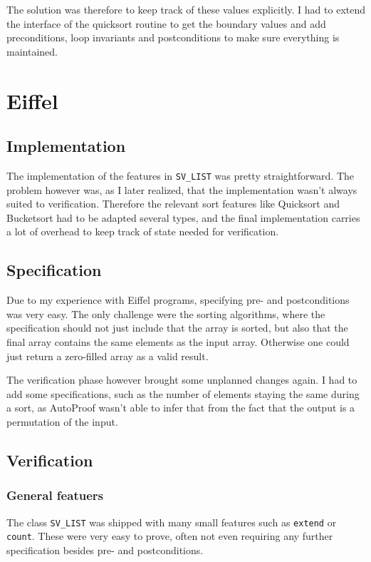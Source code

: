 \documentclass[a4paper,10pt]{article}
\begin{document}
The solution was therefore to keep track of these values explicitly.
I had to extend the interface of the quicksort routine to get the boundary values and add preconditions, 
loop invariants and postconditions to make sure everything is maintained.


\section{Eiffel}

\subsection{Implementation}

The implementation of the features in \lstinline!SV_LIST! was pretty straightforward.
The problem however was, as I later realized, that the implementation wasn't always suited to verification.
Therefore the relevant sort features like Quicksort and Bucketsort had to be adapted several types, 
and the final implementation carries a lot of overhead to keep track of state needed for verification.

\subsection{Specification}

Due to my experience with Eiffel programs, specifying pre- and postconditions was very easy.
The only challenge were the sorting algorithms, where the specification should not just include that the array is sorted,
but also that the final array contains the same elements as the input array.
Otherwise one could just return a zero-filled array as a valid result.

The verification phase however brought some unplanned changes again.
I had to add some specifications, such as the number of elements staying the same during a sort, 
as AutoProof wasn't able to infer that from the fact that the output is a permutation of the input.

\subsection{Verification}

\subsubsection{General featuers}
The class \lstinline!SV_LIST! was shipped with many small features such as \lstinline!extend! or \lstinline!count!.
These were very easy to prove, often not even requiring any further specification besides pre- and postconditions.
\end{document}
